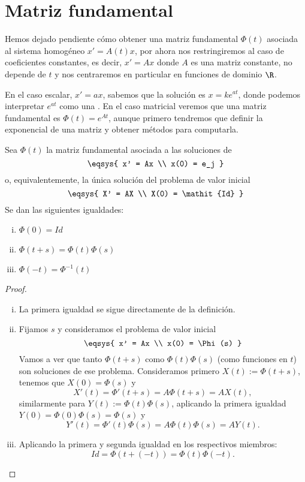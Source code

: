 \documentclass[../ecuaciones_diferenciales.tex]{subfiles}
\begin{document}
\section{Matriz fundamental}

Hemos dejado pendiente cómo obtener una matriz fundamental \(\Phi(t)\) asociada
al sistema homogéneo \(x' = A(t)x\), por ahora nos restringiremos al caso de
coeficientes constantes, es decir, \(x' = Ax\) donde \(A\) es una matriz
constante, no depende de \(t\) y nos centraremos en particular en funciones de 
dominio \(\R\).  

En el caso escalar, \(x' = ax\), sabemos que la solución es \(x = ke^{at}\),
donde podemos interpretar \(e^{at}\) como una . En el caso matricial veremos que una matriz fundamental es
\(\Phi(t) = e^{At}\), aunque primero tendremos que definir la exponencial de una
matriz y obtener métodos para computarla.

\begin{lemma}
\label{lem:expphi}
	Sea \(\Phi(t)\) la matriz fundamental asociada a las soluciones de
	\[\eqsys{
		x' = Ax \\
		x(0) = e_j
		}\]
      o, equivalentemente, la única solución del problema de valor inicial
	\[\eqsys{
		X' = AX \\
		X(0) = \mathit{Id}
		}\]
	Se dan las siguientes igualdades:
	\begin{multicols}{3}
	\begin{enumerate}[i)]
		\item \(\displaystyle \Phi(0) = \mathit{Id}\) 
		\item \(\displaystyle \Phi(t + s) = \Phi(t) \Phi(s)\) 
		\item \(\displaystyle \Phi(-t) = \Phi^{-1}(t)\) 
	\end{enumerate}
	\end{multicols}
\end{lemma}

\begin{proof}
	\begin{enumerate}[i), wide, labelwidth=0pt, labelindent=0pt]
		\item La primera igualdad se sigue directamente de la definición.
		\item Fijamos \(s\) y consideramos el problema de valor inicial
			\[\eqsys{ x' = Ax \\ x(0) = \Phi(s) }\]
			Vamos a ver que tanto \(\Phi(t + s)\) como \(\Phi(t)\Phi(s)\) (como
			funciones en \(t\)) son soluciones de ese problema. Consideramos
			primero \(X(t) := \Phi(t + s)\), tenemos que \(X(0) = \Phi(s)\) y
			\[X'(t) = \Phi'(t + s) = A \Phi(t + s) = A X(t),\]
			similarmente para \(Y(t) := \Phi(t)\Phi(s)\), aplicando la primera 
			igualdad \(Y(0) = \Phi(0)\Phi(s) = \Phi(s)\) y
			\[Y'(t) = \Phi'(t)\Phi(s) = A \Phi(t)\Phi(s) = A Y(t).\]
		\item Aplicando la primera y segunda igualdad en los respectivos
			miembros:
			\[\mathit{Id} = \Phi(t + (-t)) = \Phi(t)\Phi(-t).\]
	\end{enumerate}
\end{proof}
\end{document}
